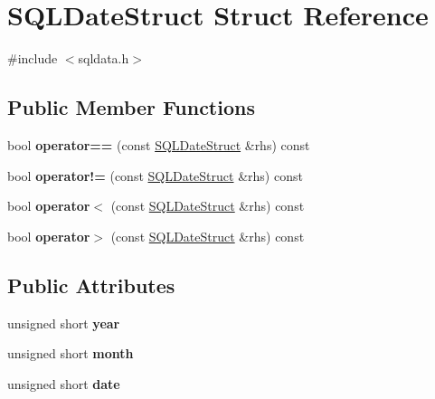 \hypertarget{struct_s_q_l_date_struct}{}\section{S\+Q\+L\+Date\+Struct Struct Reference}
\label{struct_s_q_l_date_struct}


{\ttfamily \#include $<$sqldata.\+h$>$}

\subsection*{Public Member Functions}
\begin{DoxyCompactItemize}
\item 
\mbox{\label{struct_s_q_l_date_struct_a9f80baca149693c238d4768a07a96469}} 
bool {\bfseries operator==} (const \mbox{\hyperlink{struct_s_q_l_date_struct}{S\+Q\+L\+Date\+Struct}} \&rhs) const
\item 
\mbox{\label{struct_s_q_l_date_struct_afb76cb22bdb70d721f3475d6b548f691}} 
bool {\bfseries operator!=} (const \mbox{\hyperlink{struct_s_q_l_date_struct}{S\+Q\+L\+Date\+Struct}} \&rhs) const
\item 
\mbox{\label{struct_s_q_l_date_struct_a61f4d534e3fa5c2a0e78a7d216b38a34}} 
bool {\bfseries operator$<$} (const \mbox{\hyperlink{struct_s_q_l_date_struct}{S\+Q\+L\+Date\+Struct}} \&rhs) const
\item 
\mbox{\label{struct_s_q_l_date_struct_ad215c3b13ab8dfd70e99f6b2da3693f1}} 
bool {\bfseries operator$>$} (const \mbox{\hyperlink{struct_s_q_l_date_struct}{S\+Q\+L\+Date\+Struct}} \&rhs) const
\end{DoxyCompactItemize}
\subsection*{Public Attributes}
\begin{DoxyCompactItemize}
\item 
\mbox{\label{struct_s_q_l_date_struct_a6abcee0ee84da8781f5703b1edb9831a}} 
unsigned short {\bfseries year}
\item 
\mbox{\label{struct_s_q_l_date_struct_a2a38be58b86cdaaf94c032e880e18726}} 
unsigned short {\bfseries month}
\item 
\mbox{\label{struct_s_q_l_date_struct_a506f57eeba30629016823074fef35aec}} 
unsigned short {\bfseries date}
\end{DoxyCompactItemize}


